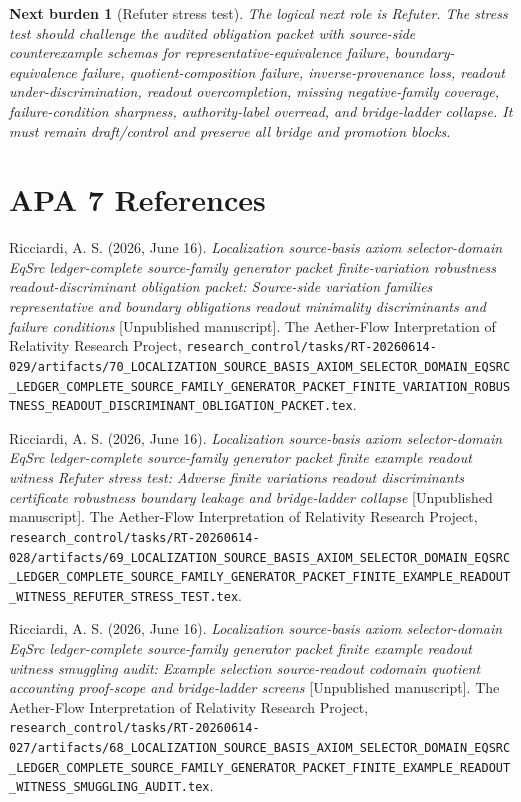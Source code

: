 \documentclass[11pt]{article}
\newtheorem{nextburden}{Next burden}
\begin{document}
\begin{nextburden}[Refuter stress test]
The logical next role is Refuter. The stress test should challenge the
audited obligation packet with source-side counterexample schemas for
representative-equivalence failure, boundary-equivalence failure,
quotient-composition failure, inverse-provenance loss, readout
under-discrimination, readout overcompletion, missing negative-family
coverage, failure-condition sharpness, authority-label overread, and
bridge-ladder collapse. It must remain draft/control and preserve all
bridge and promotion blocks.
\end{nextburden}

\section*{APA 7 References}

Ricciardi, A. S. (2026, June 16). \emph{Localization source-basis axiom
selector-domain EqSrc ledger-complete source-family generator packet
finite-variation robustness readout-discriminant obligation packet:
Source-side variation families representative and boundary obligations
readout minimality discriminants and failure conditions} [Unpublished
manuscript]. The Aether-Flow Interpretation of Relativity Research
Project,
\texttt{research\_control/tasks/RT-20260614-029/artifacts/70\_LOCALIZATION\_SOURCE\_BASIS\_AXIOM\_SELECTOR\_DOMAIN\_EQSRC\_LEDGER\_COMPLETE\_SOURCE\_FAMILY\_GENERATOR\_PACKET\_FINITE\_VARIATION\_ROBUSTNESS\_READOUT\_DISCRIMINANT\_OBLIGATION\_PACKET.tex}.

Ricciardi, A. S. (2026, June 16). \emph{Localization source-basis axiom
selector-domain EqSrc ledger-complete source-family generator packet
finite example readout witness Refuter stress test: Adverse finite
variations readout discriminants certificate robustness boundary
leakage and bridge-ladder collapse} [Unpublished manuscript]. The
Aether-Flow Interpretation of Relativity Research Project,
\texttt{research\_control/tasks/RT-20260614-028/artifacts/69\_LOCALIZATION\_SOURCE\_BASIS\_AXIOM\_SELECTOR\_DOMAIN\_EQSRC\_LEDGER\_COMPLETE\_SOURCE\_FAMILY\_GENERATOR\_PACKET\_FINITE\_EXAMPLE\_READOUT\_WITNESS\_REFUTER\_STRESS\_TEST.tex}.

Ricciardi, A. S. (2026, June 16). \emph{Localization source-basis axiom
selector-domain EqSrc ledger-complete source-family generator packet
finite example readout witness smuggling audit: Example selection
source-readout codomain quotient accounting proof-scope and
bridge-ladder screens} [Unpublished manuscript]. The Aether-Flow
Interpretation of Relativity Research Project,
\texttt{research\_control/tasks/RT-20260614-027/artifacts/68\_LOCALIZATION\_SOURCE\_BASIS\_AXIOM\_SELECTOR\_DOMAIN\_EQSRC\_LEDGER\_COMPLETE\_SOURCE\_FAMILY\_GENERATOR\_PACKET\_FINITE\_EXAMPLE\_READOUT\_WITNESS\_SMUGGLING\_AUDIT.tex}.
\end{document}
